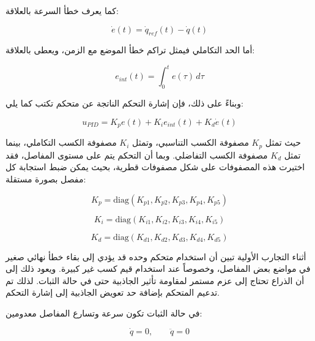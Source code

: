كما يعرف خطأ السرعة بالعلاقة:

\begin{equation}
\dot{e}(t)=\dot{q}_{ref}(t)-\dot{q}(t)
\label{eq:pid_velocity_error}
\end{equation}

أما الحد التكاملي فيمثل تراكم خطأ الموضع مع الزمن، ويعطى بالعلاقة:

\begin{equation}
e_{int}(t)=\int_0^t e(\tau)\,d\tau
\label{eq:pid_integral_error}
\end{equation}

وبناءً على ذلك، فإن إشارة التحكم الناتجة عن متحكم  تكتب كما يلي:

\begin{equation}
u_{PID}
=
K_p e(t)
+
K_i e_{int}(t)
+
K_d \dot{e}(t)
\label{eq:pid_control_signal}
\end{equation}

حيث تمثل \(K_p\) مصفوفة الكسب التناسبي، وتمثل \(K_i\) مصفوفة الكسب التكاملي، بينما تمثل \(K_d\) مصفوفة الكسب التفاضلي. وبما أن التحكم يتم على مستوى المفاصل، فقد اختيرت هذه المصفوفات على شكل مصفوفات قطرية، بحيث يمكن ضبط استجابة كل مفصل بصورة مستقلة:

\begin{equation}
K_p =
\mathrm{diag}
\left(
K_{p1},K_{p2},K_{p3},K_{p4},K_{p5}
\right)
\label{eq:pid_kp_matrix}
\end{equation}

\begin{equation}
K_i =
\mathrm{diag}
\left(
K_{i1},K_{i2},K_{i3},K_{i4},K_{i5}
\right)
\label{eq:pid_ki_matrix}
\end{equation}

\begin{equation}
K_d =
\mathrm{diag}
\left(
K_{d1},K_{d2},K_{d3},K_{d4},K_{d5}
\right)
\label{eq:pid_kd_matrix}
\end{equation}

أثناء التجارب الأولية تبين أن استخدام متحكم  وحده قد يؤدي إلى بقاء خطأ نهائي صغير في مواضع بعض المفاصل، وخصوصاً عند استخدام قيم كسب غير كبيرة. ويعود ذلك إلى أن الذراع تحتاج إلى عزم مستمر لمقاومة تأثير الجاذبية حتى في حالة الثبات. لذلك تم تدعيم المتحكم بإضافة حد تعويض الجاذبية إلى إشارة التحكم.

في حالة الثبات تكون سرعة وتسارع المفاصل معدومين:

\begin{equation}
\dot{q}=0,
\qquad
\ddot{q}=0
\label{eq:pid_static_condition}
\end{equation}

